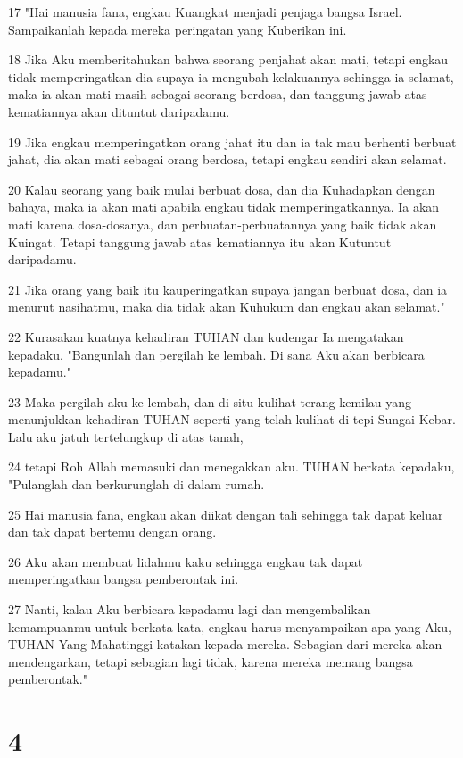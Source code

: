 \par 17 "Hai manusia fana, engkau Kuangkat menjadi penjaga bangsa Israel. Sampaikanlah kepada mereka peringatan yang Kuberikan ini.
\par 18 Jika Aku memberitahukan bahwa seorang penjahat akan mati, tetapi engkau tidak memperingatkan dia supaya ia mengubah kelakuannya sehingga ia selamat, maka ia akan mati masih sebagai seorang berdosa, dan tanggung jawab atas kematiannya akan dituntut daripadamu.
\par 19 Jika engkau memperingatkan orang jahat itu dan ia tak mau berhenti berbuat jahat, dia akan mati sebagai orang berdosa, tetapi engkau sendiri akan selamat.
\par 20 Kalau seorang yang baik mulai berbuat dosa, dan dia Kuhadapkan dengan bahaya, maka ia akan mati apabila engkau tidak memperingatkannya. Ia akan mati karena dosa-dosanya, dan perbuatan-perbuatannya yang baik tidak akan Kuingat. Tetapi tanggung jawab atas kematiannya itu akan Kutuntut daripadamu.
\par 21 Jika orang yang baik itu kauperingatkan supaya jangan berbuat dosa, dan ia menurut nasihatmu, maka dia tidak akan Kuhukum dan engkau akan selamat."
\par 22 Kurasakan kuatnya kehadiran TUHAN dan kudengar Ia mengatakan kepadaku, "Bangunlah dan pergilah ke lembah. Di sana Aku akan berbicara kepadamu."
\par 23 Maka pergilah aku ke lembah, dan di situ kulihat terang kemilau yang menunjukkan kehadiran TUHAN seperti yang telah kulihat di tepi Sungai Kebar. Lalu aku jatuh tertelungkup di atas tanah,
\par 24 tetapi Roh Allah memasuki dan menegakkan aku. TUHAN berkata kepadaku, "Pulanglah dan berkurunglah di dalam rumah.
\par 25 Hai manusia fana, engkau akan diikat dengan tali sehingga tak dapat keluar dan tak dapat bertemu dengan orang.
\par 26 Aku akan membuat lidahmu kaku sehingga engkau tak dapat memperingatkan bangsa pemberontak ini.
\par 27 Nanti, kalau Aku berbicara kepadamu lagi dan mengembalikan kemampuanmu untuk berkata-kata, engkau harus menyampaikan apa yang Aku, TUHAN Yang Mahatinggi katakan kepada mereka. Sebagian dari mereka akan mendengarkan, tetapi sebagian lagi tidak, karena mereka memang bangsa pemberontak."

\chapter{4}

